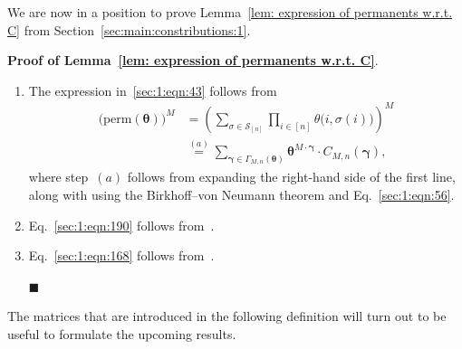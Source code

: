 \documentclass[journal,lettersize,twocolumn]{IEEEtran} %
\renewcommand\qedsymbol{$\blacksquare$}
\newcommand{\elemmaproof}{\hfill\qedsymbol}
\newcommand{\vect}[1]{ \bm{#1} }
\newcommand{\set}[1]{\mathcal{#1}}
\newcommand{\vgam}{ \vect{\gamma} }
\newcommand{\matr}[1]{ \bm{#1} }
\newcommand{\perm}{ \mathrm{perm} }
\newcommand{\setS}{\set{S}}
\newcommand{\CM}[1]{\Cgen{M}{#1}}
\newcommand{\Cgen}[2]{C_{#1,#2}}
\newcommand{\mtheta}{\matr{\theta}}
\newcommand{\vtheta}{\matr{\theta}}
\newcommand{\GamMnthe}{ \Gamma_{M,n}(\vtheta) }
\begin{document}
%

We are now in a position to prove Lemma~\ref{lem: expression of permanents
  w.r.t. C} from Section~\ref{sec:main:constributions:1}.

%

\medskip

\noindent
\textbf{Proof of Lemma~\ref{lem: expression of permanents w.r.t. C}}.
\begin{enumerate}

\item The expression in~\eqref{sec:1:eqn:43} follows from
  \begin{align*}
    \bigl( \perm(\mtheta) \bigr)^{\! M}
      &= \left(
           \sum_{\sigma \in \setS_{[n]}} 
             \prod_{i \in [n]}
               \theta\bigl( i, \sigma(i) \bigr)
         \right)^{\!\!\! M} \\
      &\overset{(a)}{=}
         \sum_{\vgam \in \GamMnthe} 
           \mtheta^{ M \cdot \vgam }
           \cdot
           \CM{n}( \vgam ), 
  \end{align*}
  where step~$(a)$ follows from expanding the right-hand side of the first
  line, along with using the Birkhoff--von Neumann theorem and
  Eq.~\eqref{sec:1:eqn:56}.

\item Eq.~\eqref{sec:1:eqn:190} follows from~\cite[Lemma~29]{Vontobel2013}.

\item Eq.~\eqref{sec:1:eqn:168} follows
  from~\cite[Theorem~2.1]{Friedland1979}.

\elemmaproof

\end{enumerate}

%

The matrices that are introduced in the following definition will turn out to
be useful to formulate the upcoming results.

%
\end{document}
